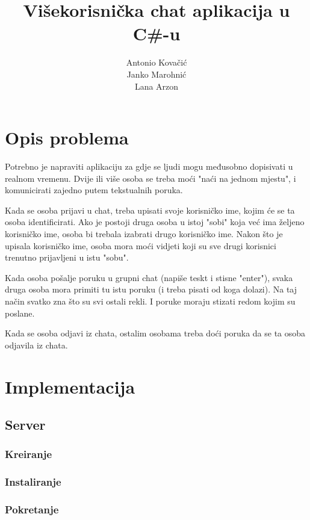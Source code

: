 \documentclass[10pt,a4paper,onecolumn,titlepage]{article}
\title{Višekorisnička chat aplikacija u C\#-u}
\author{Antonio Kovačić\\Janko Marohnić\\Lana Arzon}
\begin{document}
\maketitle

\tableofcontents

\newpage

\section{Opis problema}

Potrebno je napraviti aplikaciju za gdje se ljudi mogu međusobno dopisivati
u realnom vremenu. Dvije ili više osoba se treba moći "naći na jednom mjestu",
i komunicirati zajedno putem tekstualnih poruka.

Kada se osoba prijavi u chat, treba upisati svoje korisničko ime, kojim će se
ta osoba identificirati. Ako je postoji druga osoba u istoj "sobi" koja već
ima željeno korisničko ime, osoba bi trebala izabrati drugo korisničko ime.
Nakon što je upisala korisničko ime, osoba mora moći vidjeti koji su sve drugi
korisnici trenutno prijavljeni u istu "sobu".

Kada osoba pošalje poruku u grupni chat (napiše teskt i stisne "enter"), svaka
druga osoba mora primiti tu istu poruku (i treba pisati od koga dolazi). Na taj
način svatko zna što su svi ostali rekli. I poruke moraju stizati redom kojim
su poslane.

Kada se osoba odjavi iz chata, ostalim osobama treba doći poruka da se ta
osoba odjavila iz chata.

\section{Implementacija}

\subsection{Server}

\subsubsection{Kreiranje}

\subsubsection{Instaliranje}

\subsubsection{Pokretanje}
\end{document}
